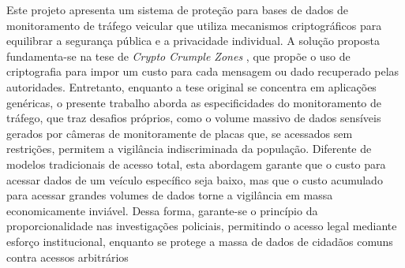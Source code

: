 \documentclass[
	12pt,				%
	openany,			%
	oneside,			%
	a4paper,			%
	english,			%
	french,				%
	spanish,			%
	brazil			%
	]{abntex2}
\begin{document}



\setlength{\absparsep}{18pt} %
\begin{resumo}
Este projeto apresenta um sistema de proteção para bases de dados de monitoramento de tráfego veicular que utiliza mecanismos criptográficos para equilibrar a segurança pública e a privacidade individual. A solução proposta fundamenta-se na tese de \textit{Crypto Crumple Zones} \cite{wright2018}, que propõe o uso de criptografia para impor um custo para cada mensagem ou dado recuperado pelas autoridades. Entretanto, enquanto a tese original se concentra em aplicações genéricas, o presente trabalho aborda as especificidades do monitoramento de tráfego, que traz desafios próprios, como o volume massivo de dados sensíveis gerados por câmeras de monitoramente de placas que, se acessados sem restrições, permitem a vigilância indiscriminada da população. Diferente de modelos tradicionais de acesso total, esta abordagem garante que o custo para acessar dados de um veículo específico seja baixo, mas que o custo acumulado para acessar grandes volumes de dados torne a vigilância em massa economicamente inviável. Dessa forma, garante-se o princípio da proporcionalidade nas investigações policiais, permitindo o acesso legal mediante esforço institucional, enquanto se protege a massa de dados de cidadãos comuns contra acessos arbitrários \cite{wright2018}

\end{resumo}


 
\end{document}

